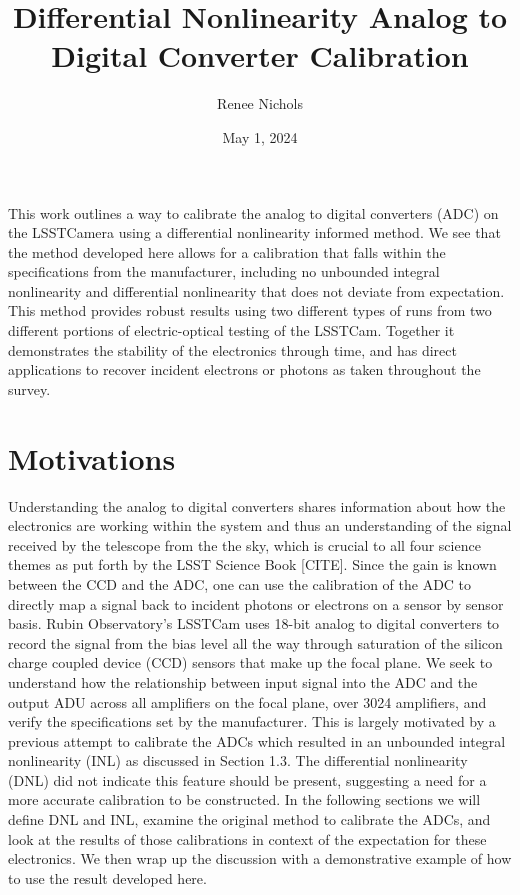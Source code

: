 \documentclass[11pt, letterpaper]{article}
\title{Differential Nonlinearity Analog to Digital Converter Calibration}
\author{Renee Nichols}
\date{May 1, 2024}
\begin{document}
\maketitle 

This work outlines a way to calibrate the analog to digital converters (ADC) on the LSSTCamera using a differential nonlinearity informed method. 
We see that the method developed here allows for a calibration that falls within the specifications from the manufacturer, including no unbounded integral nonlinearity and differential nonlinearity that does not deviate from expectation. 
This method provides robust results using two different types of runs from two different portions of electric-optical testing of the LSSTCam. 
Together it demonstrates the stability of the electronics through time, and has direct applications to recover incident electrons or photons as taken throughout the survey. 

\section{Motivations}
\indent

 
Understanding the analog to digital converters shares information about how the electronics are working within the system and thus an understanding of the signal received by the telescope from the the sky, which is crucial to all four science themes as put forth by the LSST Science Book [CITE]. 
Since the gain is known between the CCD and the ADC, one can use the calibration of the ADC to directly map a signal back to incident photons or electrons on a sensor by sensor basis.
Rubin Observatory’s LSSTCam uses 18-bit analog to digital converters to record the signal from the bias level all the way through saturation of the silicon charge coupled device (CCD) sensors that make up the focal plane. 
We seek to understand how the relationship between input signal into the ADC and the output ADU across all amplifiers on the focal plane, over 3024 amplifiers, and verify the specifications set by the manufacturer. 
This is largely motivated by a previous attempt to calibrate the ADCs which resulted in an unbounded integral nonlinearity (INL) as discussed in Section 1.3. 
The differential nonlinearity (DNL) did not indicate this feature should be present, suggesting a need for a more accurate calibration to be constructed. 
In the following sections we will define DNL and INL, examine the original method to calibrate the ADCs, and look at the results of those calibrations in context of the expectation for these electronics. 
We then wrap up the discussion with a demonstrative example of how to use the result developed here. 
\end{document}
